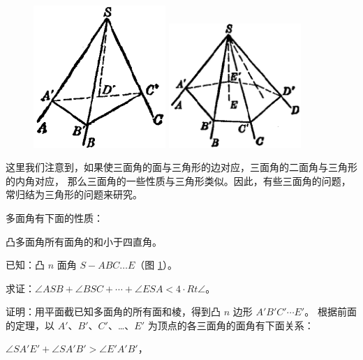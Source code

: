 \begin{figure}[htbp]
    \centering
    \begin{minipage}[b]{7cm}
        \centering
        \includegraphics[width=5cm]{../pic/ltjh-ch3-04.png}
        \caption{}\label{fig:ltjh-3-4}
    \end{minipage}
    \qquad \qquad
    \begin{minipage}[b]{7cm}
        \centering
        \includegraphics[width=5cm]{../pic/ltjh-ch3-05.png}
        \caption{}\label{fig:ltjh-3-5}
    \end{minipage}
\end{figure}

这里我们注意到，如果使三面角的面与三角形的边对应，三面角的二面角与三角形的内角对应，
那么三面角的一些性质与三角形类似。因此，有些三面角的问题，常归结为三角形的问题来研究。

多面角有下面的性质：

\begin{dingli}
    凸多面角所有面角的和小于四直角。
\end{dingli}

已知：凸 $n$ 面角 $S{-}ABC{…}E$（图 \ref{fig:ltjh-3-5}）。

求证：$\angle ASB + \angle BSC + \cdots + \angle ESA < 4 \cdot Rt \angle$。

证明：用平面截已知多面角的所有面和棱，得到凸 $n$ 边形 $A'B'C'\cdots E'$。
根据前面的定理，以 $A'$、$B'$、$C'$、…、$E'$ 为顶点的各三面角的面角有下面关系：

$\angle SA'E'+ \angle SA'B' > \angle E'A'B'$，

